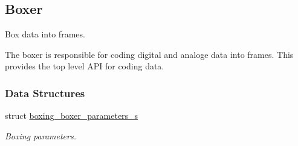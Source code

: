 \hypertarget{group__boxer}{
\subsection{Boxer}
\label{group__boxer}
}


Box data into frames.

The boxer is responsible for coding digital and analoge data into frames. This provides the top level API for coding data.  
\subsubsection*{Data Structures}
\begin{DoxyCompactItemize}
\item 
struct \hyperlink{structboxing__boxer__parameters__s}{boxing\_\-boxer\_\-parameters\_\-s}
\begin{DoxyCompactList}\small\item\em Boxing parameters. \item\end{DoxyCompactList}\end{DoxyCompactItemize}
